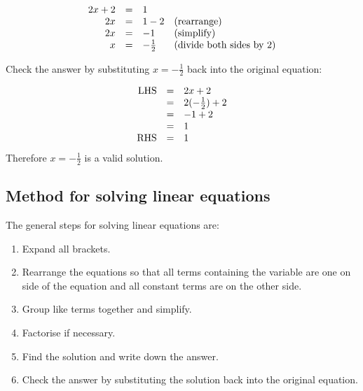 \begin{equation*}
  \begin{array}{ccll}\hfill 2x+2& =& 1\hfill \\ 
      \hfill 2x& =& 1-2\hfill & \mbox{(rearrange)}\hfill \\ 
      \hfill 2x& =& -1\hfill & \mbox{(simplify)}\hfill \\
\hfill x&=& -\frac{1}{2} & \mbox{(divide both sides by $2$)} \hfill
  \end{array}
\end{equation*}

\begin{equation*}

\end{equation*}
Check the answer by substituting $x=-\frac{1}{2}$ back into the original equation:

\begin{equation*}
    \begin{array}{ccl}\hfill \mbox{LHS}& =& 2x+2\hfill \\
	  & =& 2(-\frac{1}{2})+2\hfill \\
	  & =& -1+2\hfill \\
	  & =& 1\hfill \\
	  \hfill \mbox{RHS}& =& 1\hfill \\
    \end{array}
\end{equation*}
Therefore $x = -\frac{1}{2}$ is a valid solution.


\subsection*{Method for solving linear equations}

The general steps for solving linear equations are:
\begin{enumerate}[noitemsep, label=\textbf{\arabic*}. ] 
    \item  Expand all brackets.
    \item Rearrange the equations so that all terms containing the variable are one on side of the equation and all constant terms are on the other side.
    \item  Group like terms together and simplify.
\item Factorise if necessary.
    \item  Find the solution and write down the answer.
    \item Check the answer by substituting the solution back into the original equation.
\end{enumerate}

